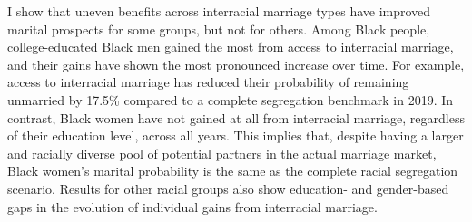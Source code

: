 
I show that uneven benefits across interracial marriage types have improved marital prospects for some groups, but not for others.  Among Black people, college-educated Black men gained the most from access to interracial marriage, and their gains have shown the most pronounced increase over time. For example, access to interracial marriage has reduced their probability of remaining unmarried by 17.5\% compared to a complete segregation benchmark in 2019. In contrast, Black women have not gained at all from interracial marriage, regardless of their education level, across all years. This implies that, despite having a larger and racially diverse pool of potential partners in the actual marriage market, Black women's marital probability is the same as the complete racial segregation scenario. Results for other racial groups also show education- and gender-based gaps in the evolution of individual gains from interracial marriage.


